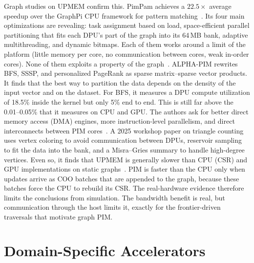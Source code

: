 \documentclass[journal,onecolumn]{IEEEtran}
\begin{document}
Graph studies on UPMEM confirm this. PimPam achieves a $22.5\times$ average speedup over the GraphPi CPU framework for pattern matching~\cite{cai2024pimpam}. Its four main optimizations are revealing: task assignment based on load, space-efficient parallel partitioning that fits each DPU's part of the graph into its 64\,MB bank, adaptive multithreading, and dynamic bitmaps. Each of them works around a limit of the platform (little memory per core, no communication between cores, weak in-order cores). None of them exploits a property of the graph~\cite{cai2024pimpam}. ALPHA-PIM rewrites BFS, SSSP, and personalized PageRank as sparse matrix--sparse vector products. It finds that the best way to partition the data depends on the density of the input vector and on the dataset. For BFS, it measures a DPU compute utilization of 18.5\% inside the kernel but only 5\% end to end. This is still far above the 0.01--0.05\% that it measures on CPU and GPU. The authors ask for better direct memory access (DMA) engines, more instruction-level parallelism, and direct interconnects between PIM cores~\cite{barkhordar2025alphapim}. A 2025 workshop paper on triangle counting uses vertex coloring to avoid communication between DPUs, reservoir sampling to fit the data into the bank, and a Misra--Gries summary to handle high-degree vertices. Even so, it finds that UPMEM is generally slower than CPU (CSR) and GPU implementations on static graphs~\cite{asquini2025tc}. PIM is faster than the CPU only when updates arrive as COO batches that are appended to the graph, because these batches force the CPU to rebuild its CSR. The real-hardware evidence therefore limits the conclusions from simulation. The bandwidth benefit is real, but communication through the host limits it, exactly for the frontier-driven traversals that motivate graph PIM.

\section{Domain-Specific Accelerators}\label{sec:dsa}
\end{document}
